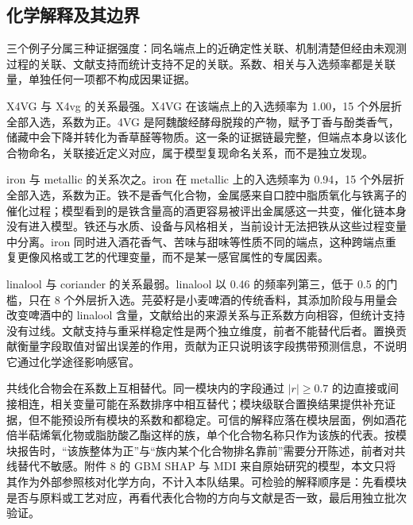 \subsection{化学解释及其边界}

三个例子分属三种证据强度：同名端点上的近确定性关联、机制清楚但经由未观测过程的关联、文献支持而统计支持不足的关联。系数、相关与入选频率都是关联量，单独任何一项都不构成因果证据。

X4VG 与 X4vg 的关系最强。X4VG 在该端点上的入选频率为 1.00，15 个外层折全部入选，系数为正。4VG 是阿魏酸经酵母脱羧的产物，赋予丁香与酚类香气，储藏中会下降并转化为香草醛等物质\cite{vanbeneden2008}。这一条的证据链最完整，但端点本身以该化合物命名，关联接近定义对应，属于模型复现命名关系，而不是独立发现。

iron 与 metallic 的关系次之。iron 在 metallic 上的入选频率为 0.94，15 个外层折全部入选，系数为正。铁不是香气化合物，金属感来自口腔中脂质氧化与铁离子的催化过程\cite{omur2012}；模型看到的是铁含量高的酒更容易被评出金属感这一共变，催化链本身没有进入模型。铁还与水质、设备与风格相关，当前设计无法把铁从这些过程变量中分离。iron 同时进入酒花香气、苦味与甜味等性质不同的端点，这种跨端点重复更像风格或工艺的代理变量，而不是某一感官属性的专属因素。

linalool 与 coriander 的关系最弱。linalool 以 0.46 的频率列第三，低于 0.5 的门槛，只在 8 个外层折入选。芫荽籽是小麦啤酒的传统香料，其添加阶段与用量会改变啤酒中的 linalool 含量\cite{pater2024}，文献给出的来源关系与正系数方向相容，但统计支持没有过线。文献支持与重采样稳定性是两个独立维度，前者不能替代后者。置换贡献衡量字段取值对留出误差的作用，贡献为正只说明该字段携带预测信息，不说明它通过化学途径影响感官。

共线化合物会在系数上互相替代。同一模块内的字段通过 $|r|\ge0.7$ 的边直接或间接相连，相关变量可能在系数排序中相互替代；模块级联合置换结果提供补充证据，但不能预设所有模块的系数和都稳定。可信的解释应落在模块层面，例如酒花倍半萜烯氧化物或脂肪酸乙酯这样的族，单个化合物名称只作为该族的代表。按模块报告时，“该族整体为正”与“族内某个化合物排名靠前”需要分开陈述，前者对共线替代不敏感。附件 8 的 GBM SHAP 与 MDI 来自原始研究的模型，本文只将其作为外部参照核对化学方向，不计入本队结果\cite{lundberg2017}。可检验的解释顺序是：先看模块是否与原料或工艺对应，再看代表化合物的方向与文献是否一致，最后用独立批次验证。

